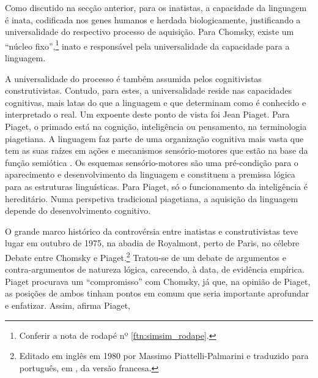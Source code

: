 \documentclass[output=paper]{LSP/langsci}
\begin{document}
Como discutido na secção anterior, para os inatistas, a capacidade da linguagem é inata, codificada nos genes humanos e herdada biologicamente, justificando a universalidade do respectivo processo de aquisição. Para Chomsky, existe um ``núcleo fixo'',\footnote{Conferir a nota de rodapé nº \ref{ftn:simsim_rodape}.} inato e responsável pela universalidade da capacidade para a linguagem. 

A universalidade do processo é também assumida pelos cognitivistas construtivistas. Contudo, para estes, a universalidade reside nas capacidades cognitivas, mais latas do que a linguagem e que determinam como é conhecido e interpretado o real. Um expoente deste ponto de vista foi Jean Piaget. Para Piaget, o primado está na cognição, inteligência ou pensamento, na terminologia piagetiana. A linguagem faz parte de uma organização cognitiva mais vasta que tem as suas raízes em ações e mecanismos sensório-motores que estão na base da função semiótica \citep{piagetinhelder1966}. Os esquemas sensório-motores são uma pré-condição para o aparecimento e desenvolvimento da linguagem e constituem a premissa lógica para as estruturas linguísticas. Para Piaget, só o funcionamento da inteligência é hereditário. Numa perspetiva tradicional piagetiana, a aquisição da linguagem depende do desenvolvimento cognitivo. 

O grande marco histórico da controvérsia entre inatistas e construtivistas teve lugar em outubro de 1975, na abadia de Royalmont, perto de Paris, no célebre Debate entre Chomsky e Piaget.\footnote{Editado em inglês em 1980 por Massimo Piattelli-Palmarini e traduzido para português, em \citeyear{piattelli-palmarini1987}, da versão francesa.} Tratou-se de um debate de argumentos e contra-argumentos de natureza lógica, carecendo, à data, de evidência empírica. Piaget procurava um ``compromisso'' com Chomsky, já que, na opinião de Piaget, as posições de ambos tinham pontos em comum que seria importante aprofundar e enfatizar. Assim, afirma Piaget,
\end{document}
